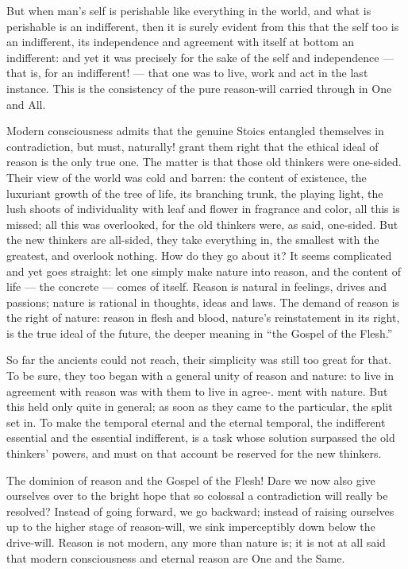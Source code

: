 \documentclass[12pt,a4paper,openany]{book}
\newcommand{\opage}[1]{\marginnote{\footnotesize\textit{[#1]}}}
\begin{document}
But when man's self is perishable like everything in
\setcounter{footnote}{0}%
\opage{32}the world, and what is perishable is an indifferent, then it is surely evident from this that the self too is an
indifferent, its independence and agreement with itself at bottom an indifferent: and yet it was precisely for the sake of
the self and independence --- that is, for an indifferent! --- that one was to live, work and act in the last instance.
This is the consistency of the pure reason-will carried through in One and All.

Modern consciousness admits that the genuine Stoics entangled themselves in contradiction, but must, naturally!
grant them right that the ethical ideal of reason is the only true one. The matter is that those old thinkers were
one-sided. Their view of the world was cold and barren: the content of existence, the luxuriant growth of the tree of life,
its branching trunk, the playing light, the lush shoots of individuality with leaf and flower in fragrance and color, all
this is missed; all this was overlooked, for the old thinkers were, as said, one-sided. But the new thinkers are all-sided,
they take everything in, the smallest with the greatest, and overlook nothing. How do they go about it? It seems
complicated and yet goes straight: let one simply make nature into reason, and the content of life --- the concrete --- comes
of itself. Reason is natural in feelings, drives and passions; nature is rational in thoughts, ideas and laws. The demand of
reason is the right of nature: reason in flesh and blood, nature's reinstatement in its right, is the true ideal of the
future, the deeper meaning in ``the Gospel of the Flesh.''

So far the ancients could not reach, their simplicity was still too great for that. To be sure, they too began with a general
unity of reason and nature: to live in agreement with reason was with them to live in agree-.
ment with nature. But this held only quite in general; as soon as they came to the particular, the split set in. To make the
temporal eternal and the eternal temporal, the indifferent essential and the essential indifferent, is a task whose solution
surpassed the old
\setcounter{footnote}{0}%
\opage{33}thinkers' powers, and must on that account be reserved for the new thinkers.

The dominion of reason and the Gospel of the Flesh! Dare we now also give ourselves over to the bright hope that so colossal
a contradiction will really be resolved? Instead of going forward, we go backward; instead of raising ourselves up to the
higher stage of reason-will, we sink imperceptibly down below the drive-will. Reason is not modern, any more than nature
is; it is not at all said that modern consciousness and eternal reason are One and the Same.
\end{document}
